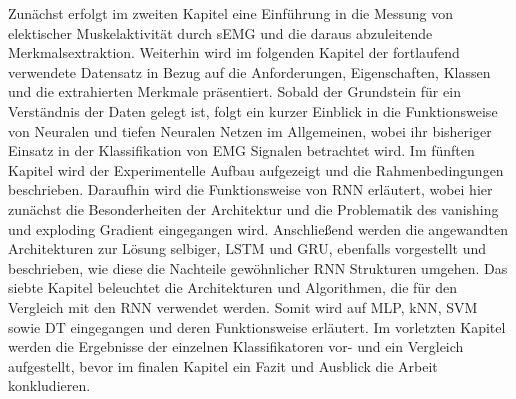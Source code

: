 Zunächst erfolgt im zweiten Kapitel eine Einführung in die Messung von elektischer Muskelaktivität durch sEMG und die daraus abzuleitende Merkmalsextraktion.
Weiterhin wird im folgenden Kapitel der fortlaufend verwendete Datensatz in Bezug auf die Anforderungen, Eigenschaften, Klassen und die extrahierten Merkmale präsentiert.
Sobald der Grundstein für ein Verständnis der Daten gelegt ist, folgt ein kurzer
Einblick in die Funktionsweise von Neuralen und tiefen Neuralen Netzen im Allgemeinen, wobei ihr bisheriger Einsatz in der Klassifikation von EMG Signalen betrachtet wird.
Im fünften Kapitel wird der Experimentelle Aufbau aufgezeigt und die Rahmenbedingungen beschrieben. 
Daraufhin wird die
Funktionsweise von RNN erläutert, wobei hier zunächst die Besonderheiten der Architektur und die Problematik des vanishing und exploding Gradient eingegangen wird. Anschließend werden die angewandten Architekturen zur Lösung selbiger, LSTM und GRU, ebenfalls vorgestellt und beschrieben, wie diese die Nachteile gewöhnlicher RNN Strukturen umgehen.
Das siebte
Kapitel beleuchtet die Architekturen und Algorithmen, die für den Vergleich mit den RNN verwendet werden. Somit wird auf MLP, kNN, SVM sowie DT eingegangen und deren Funktionsweise erläutert.
Im vorletzten Kapitel werden die Ergebnisse der einzelnen Klassifikatoren vor- und ein Vergleich aufgestellt, bevor im finalen Kapitel ein Fazit und
Ausblick die Arbeit konkludieren.

